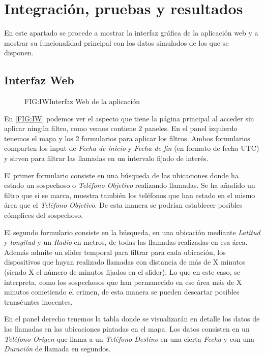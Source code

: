 \chapter{Integración, pruebas y resultados\label{CAP:IPR}}
  En este apartado se procede a mostrar la interfaz gráfica de la aplicación web y a mostrar su funcionalidad principal con los datos simulados de los que se disponen.
  
  \section{Interfaz Web}
    
    \begin{figure}[Interfaz Web de la aplicación]{FIG:IW}{Interfaz Web de la aplicación}
    \end{figure}
    
    En \ref{FIG:IW} podemos ver el aspecto que tiene la página principal al acceder sin aplicar ningún filtro, como vemos contiene 2 paneles. 
    En el panel izquierdo tenemos el mapa y los 2 formularios para aplicar los filtros. Ambos formularios comparten los input de \textit{Fecha de inicio} y \textit{Fecha de fin} (en formato de fecha UTC) y sirven para filtrar las llamadas en un intervalo fijado de interés.
    
    El primer formulario consiste en una búsqueda de las ubicaciones donde ha estado un sospechoso o \textit{Teléfono Objetivo} realizando llamadas. 
    Se ha añadido un filtro que si se marca, muestra también los teléfonos que han estado en el mismo área que el \textit{Teléfono Objetivo}. De esta manera se podrían establecer posibles cómplices del sospechoso.
  
    El segundo formulario consiste en la búsqueda, en una ubicación mediante \textit{Latitud} y \textit{longitud} y un \textit{Radio} en metros, de todas las llamadas realizadas en esa área.
    Además admite un slider temporal para filtrar para cada ubicación, los dispositivos que hayan realizado llamadas con distancia de más de X minutos (siendo X el número de minutos fijados en el slider). Lo que en este caso, se interpreta, como los sospechosos que han permanecido en ese área más de X minutos cometiendo el crimen, de esta manera se pueden descartar posibles transéuntes inocentes.
    
    En el panel derecho tenemos la tabla donde se visualizarán en detalle los datos de las llamadas en las ubicaciones pintadas en el mapa. Los datos consisten en un \textit{Teléfono Origen} que llama a un \textit{Teléfono Destino} en una cierta \textit{Fecha} y con una \textit{Duración} de llamada en segundos.
